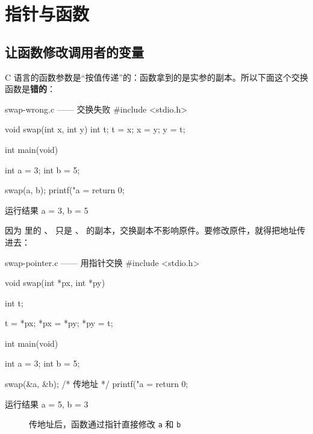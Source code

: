 \section{指针与函数}

\subsection{让函数修改调用者的变量}

C 语言的函数参数是“按值传递”的：函数拿到的是实参的副本。所以下面这个交换函数是\textbf{错的}：

\begin{codebox}{swap-wrong.c —— 交换失败}
#include <stdio.h>

void swap(int x, int y)
{
    int t;
    t = x;
    x = y;
    y = t;
}

int main(void)
{
    int a = 3;
    int b = 5;

    swap(a, b);
    printf("a = %
    return 0;
}
\end{codebox}

\begin{outbox}{运行结果}
a = 3, b = 5
\end{outbox}

因为  里的 、 只是 、 的副本，交换副本不影响原件。要修改原件，就得把地址传进去：

\begin{codebox}{swap-pointer.c —— 用指针交换}
#include <stdio.h>

void swap(int *px, int *py)
{
    int t;

    t = *px;
    *px = *py;
    *py = t;
}

int main(void)
{
    int a = 3;
    int b = 5;

    swap(&a, &b);       /* 传地址 */
    printf("a = %
    return 0;
}
\end{codebox}

\begin{outbox}{运行结果}
a = 5, b = 3
\end{outbox}

\begin{figure}[htbp]
  \centering
  \caption{传地址后，函数通过指针直接修改 \texttt{a} 和 \texttt{b}}
  \label{fig:swap-pointer}
\end{figure}

